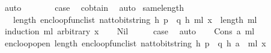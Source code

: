 \begin{isabellebody}
\ auto\ \ \isanewline
\ \ \isamarkupfalse%
\ \isamarkupfalse%
\ {\isacharquery}{\kern0pt}case\ \isamarkupfalse%
\ c{\isacharunderscore}{\kern0pt}obtain\ \isamarkupfalse%
\ auto\isanewline
{}\isamarkupfalse%
%
\endisatagproof
{\isafoldproof}%
%
\isadelimproof
\isanewline
%
\endisadelimproof
\isanewline
\isanewline
{}\isamarkupfalse%
\ same{\isacharunderscore}{\kern0pt}length{\isacharcolon}{\kern0pt}\isanewline
\ \ \ {\isachardoublequoteopen}length\ {\isacharparenleft}{\kern0pt}enc{\isacharunderscore}{\kern0pt}loop{\isacharunderscore}{\kern0pt}func{\isacharunderscore}{\kern0pt}list\ {\isacharparenleft}{\kern0pt}nat{\isacharunderscore}{\kern0pt}to{\isacharunderscore}{\kern0pt}bitstring\ h{\isacharcomma}{\kern0pt}\ p\ {\isacharasterisk}{\kern0pt}\ q{\isacharcomma}{\kern0pt}\ h{\isacharcomma}{\kern0pt}\ m{\isacharunderscore}{\kern0pt}l{\isacharparenright}{\kern0pt}\ x{\isacharunderscore}{\kern0pt}{}{\isacharparenright}{\kern0pt}\ {\isacharequal}{\kern0pt}\ length\ m{\isacharunderscore}{\kern0pt}l{\isachardoublequoteclose}\isanewline
%
\isadelimproof
%
\endisadelimproof
%
\isatagproof
{}\isamarkupfalse%
\ {\isacharparenleft}{\kern0pt}induction\ m{\isacharunderscore}{\kern0pt}l\ arbitrary{\isacharcolon}{\kern0pt}\ x{\isacharunderscore}{\kern0pt}{}{\isacharparenright}{\kern0pt}\isanewline
\ \ \isamarkupfalse%
\ Nil\isanewline
\ \ \isamarkupfalse%
\ \isamarkupfalse%
\ {\isacharquery}{\kern0pt}case\ \isamarkupfalse%
\ auto\isanewline
{}\isamarkupfalse%
\isanewline
\ \ \isamarkupfalse%
\ {\isacharparenleft}{\kern0pt}Cons\ a\ m{\isacharunderscore}{\kern0pt}l{\isacharparenright}{\kern0pt}\isanewline
\ \ \isamarkupfalse%
\ enc{\isacharunderscore}{\kern0pt}loop{\isacharunderscore}{\kern0pt}open{\isacharcolon}{\kern0pt}\ {\isachardoublequoteopen}length\ {\isacharparenleft}{\kern0pt}enc{\isacharunderscore}{\kern0pt}loop{\isacharunderscore}{\kern0pt}func{\isacharunderscore}{\kern0pt}list\ {\isacharparenleft}{\kern0pt}nat{\isacharunderscore}{\kern0pt}to{\isacharunderscore}{\kern0pt}bitstring\ h{\isacharcomma}{\kern0pt}\ p\ {\isacharasterisk}{\kern0pt}\ q{\isacharcomma}{\kern0pt}\ h{\isacharcomma}{\kern0pt}\ a\ {\isacharhash}{\kern0pt}\ m{\isacharunderscore}{\kern0pt}l{\isacharparenright}{\kern0pt}\ x{\isacharunderscore}{\kern0pt}{}{\isacharparenright}{\kern0pt}\ {\isacharequal}{\kern0pt}\ \isanewline

\end{isabellebody}
